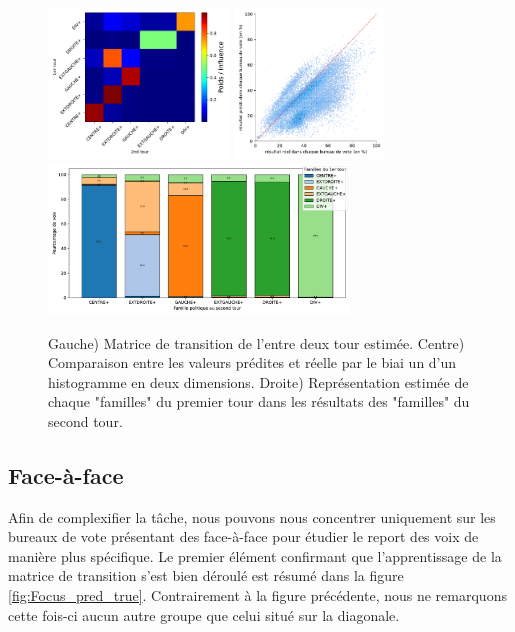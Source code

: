\documentclass[11pt]{article}
\begin{document}
            \begin{figure}[h]
                \begin{center}
                    \includegraphics[height=4cm]{Famille_Matrice.pdf}
                    \includegraphics[height=4cm]{Famille_True_Pred_Hist.pdf}
                    \includegraphics[height=4cm]{Famille_Proportions.pdf}
                    \caption{Gauche) Matrice de transition de l'entre deux tour estimée. Centre) Comparaison entre les valeurs prédites et réelle par le biai un d'un histogramme en deux dimensions. Droite) Représentation estimée de chaque "familles" du premier tour dans les résultats des "familles" du second tour.}
                    \label{fig:Famille}
                \end{center}
            \end{figure}

        \subsection*{Face-à-face}

            Afin de complexifier la tâche, nous pouvons nous concentrer uniquement sur les bureaux de vote présentant des face-à-face pour étudier le report des voix de manière plus spécifique. Le premier élément confirmant que l'apprentissage de la matrice de transition s'est bien déroulé est résumé dans la figure \ref{fig:Focus_pred_true}. Contrairement à la figure précédente, nous ne remarquons cette fois-ci aucun autre groupe que celui situé sur la diagonale.
            
\end{document}
